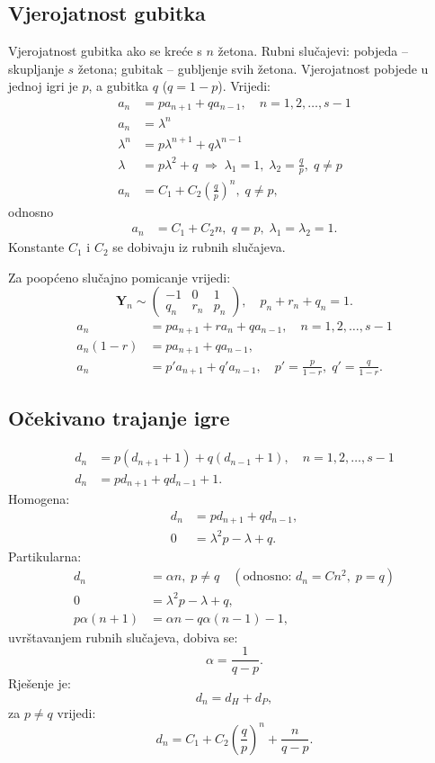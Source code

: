 \documentclass[12pt,english]{article}
\begin{document}
\subsection{Vjerojatnost gubitka}
Vjerojatnost gubitka ako se kreće s $n$ žetona. Rubni slučajevi: pobjeda -- skupljanje $s$ žetona; gubitak -- gubljenje svih žetona. Vjerojatnost pobjede u jednoj igri je $p$, a gubitka $q$ ($q = 1-p$). Vrijedi:
\begin{align*}
a_n &= pa_{n+1}+qa_{n-1}, \quad n=1, 2, \ldots, s-1\\
a_n &= \lambda^n\\
\lambda^n &= p\lambda^{n+1}+q\lambda^{n-1}\\
\lambda &= p\lambda^2 + q \; \Rightarrow \; \lambda_1 = 1,\; \lambda_2 = \frac{q}{p},\; q \neq p\\
a_n &= C_1 + C_2 \left( \frac{q}{p} \right)^n,\; q \neq p,
\end{align*}
odnosno
\begin{align*}
a_n &= C_1 + C_2n,\; q = p,\; \lambda_1 = \lambda_2 = 1.
\end{align*}
Konstante $C_1$ i $C_2$ se dobivaju iz rubnih slučajeva.

Za poopćeno slučajno pomicanje vrijedi:
$$\mathbf Y_n \sim \left( \begin{array}{lcr}
-1 & 0 & 1\\
q_n & r_n & p_n
\end{array} \right),
\quad p_n+r_n+q_n = 1.$$
\begin{align*}
a_n &= pa_{n+1}+ra_n+qa_{n-1}, \quad n=1, 2, \ldots, s-1\\
a_n(1-r) &= pa_{n+1}+qa_{n-1},\\
a_n &= p'a_{n+1}+q'a_{n-1}, \quad p' = \frac{p}{1-r},\; q' = \frac{q}{1-r}.
\end{align*}

\subsection{Očekivano trajanje igre}
\begin{align*}
d_n &= p(d_{n+1}+1)+q(d_{n-1}+1), \quad n=1, 2, \ldots, s-1\\
d_n &= pd_{n+1}+qd_{n-1} + 1.
\end{align*}
Homogena:
\begin{align*}
d_n &= pd_{n+1}+qd_{n-1},\\
0 &= \lambda^2p - \lambda + q.
\end{align*}
Partikularna:
\begin{align*}
d_n &= \alpha n,\; p \neq q \quad (\text{odnosno: } d_n =Cn^2,\; p=q)\\
0 &= \lambda^2p - \lambda + q,\\
p\alpha(n+1) &= \alpha n - q\alpha(n-1)-1,
\end{align*}
uvrštavanjem rubnih slučajeva, dobiva se:
$$\alpha = \frac{1}{q-p}.$$
Rješenje je:
$$d_n = d_H + d_P,$$
za $p \neq q$ vrijedi:
$$d_n = C_1 + C_2\left ( \frac{q}{p}\right)^n + \frac{n}{q-p}.$$
\end{document}
